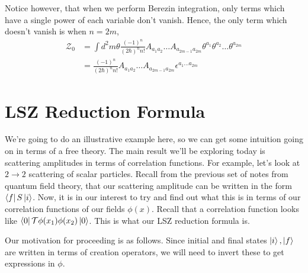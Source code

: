 \documentclass[11pt, oneside]{article}   	%
\theoremstyle{slanted}
\begin{document}
Notice however, that 
when we perform Berezin integration, 
only terms which 
have a single power of each variable
don't vanish. 
Hence, the only term which doesn't 
vanish is when $ n = 2m $, 
\begin{align*}
\mathcal{  Z} _ 0 & = 
\int d ^2m \theta \frac{\left(  - 1  \right)  ^ n  }{ 
\left( 2 \hbar  \right)  ^ n n ! } A_{ a_1 a_2 } \dots A _{ a_{ 2m - 1 } a _{ 2m } } 
\theta ^{ a_1 } \theta ^{ a_2 } \dots \theta ^{ a _{ 2m } } \\
&=  \frac{\left( - 1  \right)  ^ n }{ 
\left( 2 \hbar  \right)  ^ n n ! } A_{ a_1 a_2 } \dots 
A_{ a _{ 2m  - 1 } a _{ 2m }  } \epsilon ^{ 
a_1 \dots a _{ 2m  } }
\end{align*}


\pagebreak 
\section{LSZ Reduction Formula}
We're going to 
do an illustrative example here, 
so we can get some intuition going on 
in terms of a free theory. 
The main result we'll be exploring 
today is 
scattering amplitudes in terms 
of correlation functions. For example,
let's look at $ 2 \to 2 $ scattering 
of scalar particles. 
Recall from the previous set of notes 
from quantum field theory, that our scattering 
amplitude can be written in the form $ \bra{ f }S\ket{ i } $. 
Now, it is in our interest to try and find out 
what this is in terms of our correlation functions of 
our fields $ \phi \left( x  \right) $. 
Recall that a correlation function looks like $ \bra{0}\mathcal{T }\phi ( x_1 )\phi(x_2 )\ket{0}    $. 
This is what our LSZ reduction formula is. 

Our motivation for proceeding 
is as follows. 
Since initial and final states $ \ket{ i }, \ket{ f }  $ 
are written in terms of creation operators, 
we will need to invert these to 
get expressions in $ \phi $. 
\end{document}
